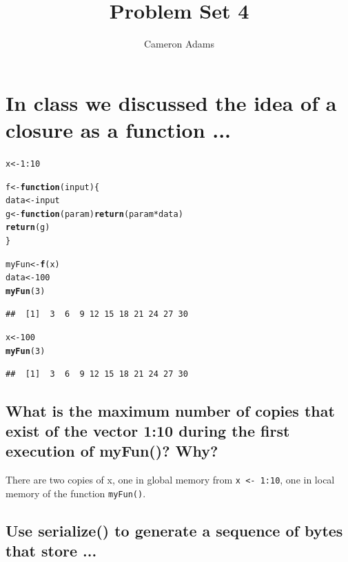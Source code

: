 \documentclass{article}\usepackage[]{graphicx}\usepackage[]{color}
\title{Problem Set 4}
\author{Cameron Adams}
\makeatletter
\newcommand{\hlnum}[1]{\textcolor[rgb]{0.686,0.059,0.569}{#1}}%
\newcommand{\hlopt}[1]{\textcolor[rgb]{0,0,0}{#1}}%
\newcommand{\hlstd}[1]{\textcolor[rgb]{0.345,0.345,0.345}{#1}}%
\newcommand{\hlkwa}[1]{\textcolor[rgb]{0.161,0.373,0.58}{\textbf{#1}}}%
\newcommand{\hlkwb}[1]{\textcolor[rgb]{0.69,0.353,0.396}{#1}}%
\newcommand{\hlkwc}[1]{\textcolor[rgb]{0.333,0.667,0.333}{#1}}%
\newcommand{\hlkwd}[1]{\textcolor[rgb]{0.737,0.353,0.396}{\textbf{#1}}}%
\newenvironment{kframe}{%
 \def\at@end@of@kframe{}%
 \ifinner\ifhmode%
  \def\at@end@of@kframe{\end{minipage}}%
  \begin{minipage}{\columnwidth}%
 \fi\fi%
 \def\FrameCommand##1{\hskip\@totalleftmargin \hskip-\fboxsep
 \colorbox{shadecolor}{##1}\hskip-\fboxsep
     \hskip-\linewidth \hskip-\@totalleftmargin \hskip\columnwidth}%
 \MakeFramed {\advance\hsize-\width
   \@totalleftmargin\z@ \linewidth\hsize
   \@setminipage}}%
 {\par\unskip\endMakeFramed%
 \at@end@of@kframe}
\newenvironment{knitrout}{}{} %
\makeatother
\begin{document}

\maketitle






\section{In class we discussed the idea of a closure as a function ...}


\begin{knitrout}
\color{fgcolor}\begin{kframe}
\begin{alltt}
\hlstd{x} \hlkwb{<-} \hlnum{1}\hlopt{:}\hlnum{10}

\hlstd{f} \hlkwb{<-} \hlkwa{function}\hlstd{(}\hlkwc{input}\hlstd{)\{}
    \hlstd{data} \hlkwb{<-} \hlstd{input}
    \hlstd{g} \hlkwb{<-} \hlkwa{function}\hlstd{(}\hlkwc{param}\hlstd{)} \hlkwd{return}\hlstd{(param} \hlopt{*} \hlstd{data)}
    \hlkwd{return}\hlstd{(g)}
\hlstd{\}}

\hlstd{myFun} \hlkwb{<-} \hlkwd{f}\hlstd{(x)}
\hlstd{data} \hlkwb{<-} \hlnum{100}
\hlkwd{myFun}\hlstd{(}\hlnum{3}\hlstd{)}
\end{alltt}
\begin{verbatim}
##  [1]  3  6  9 12 15 18 21 24 27 30
\end{verbatim}
\begin{alltt}
\hlstd{x} \hlkwb{<-} \hlnum{100}
\hlkwd{myFun}\hlstd{(}\hlnum{3}\hlstd{)}
\end{alltt}
\begin{verbatim}
##  [1]  3  6  9 12 15 18 21 24 27 30
\end{verbatim}
\end{kframe}
\end{knitrout}

\subsection{What is the maximum number of copies that exist of the vector 1:10 during the first execution of myFun()? Why?} %

There are two copies of x, one in global memory from \texttt{x <- 1:10}, one in local memory of the function \texttt{myFun()}.

\subsection{Use serialize() to generate a sequence of bytes that store  ...} %
\end{document}

